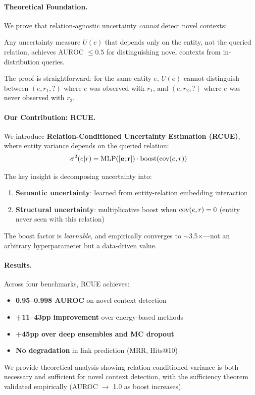 \paragraph{Theoretical Foundation.}
We prove that relation-agnostic uncertainty \emph{cannot} detect novel contexts:

\begin{theorem}
Any uncertainty measure $U(e)$ that depends only on the entity, not the queried relation, achieves AUROC $\leq 0.5$ for distinguishing novel contexts from in-distribution queries.
\end{theorem}

The proof is straightforward: for the same entity $e$, $U(e)$ cannot distinguish between $(e, r_1, ?)$ where $e$ was observed with $r_1$, and $(e, r_2, ?)$ where $e$ was never observed with $r_2$.

\paragraph{Our Contribution: RCUE.}
We introduce \textbf{Relation-Conditioned Uncertainty Estimation (RCUE)}, where entity variance depends on the queried relation:
\[
\sigma^2(e | r) = \text{MLP}([\mathbf{e}; \mathbf{r}]) \cdot \text{boost}(\mathrm{cov}(e, r))
\]

The key insight is decomposing uncertainty into:
\begin{enumerate}
    \item \textbf{Semantic uncertainty}: learned from entity-relation embedding interaction
    \item \textbf{Structural uncertainty}: multiplicative boost when $\mathrm{cov}(e,r) = 0$ (entity never seen with this relation)
\end{enumerate}

The boost factor is \emph{learnable}, and empirically converges to $\sim$3.5$\times$---not an arbitrary hyperparameter but a data-driven value.

\paragraph{Results.}
Across four benchmarks, RCUE achieves:
\begin{itemize}
    \item \textbf{0.95--0.998 AUROC} on novel context detection
    \item \textbf{+11--43pp improvement} over energy-based methods
    \item \textbf{+45pp over deep ensembles and MC dropout}
    \item \textbf{No degradation} in link prediction (MRR, Hits@10)
\end{itemize}

We provide theoretical analysis showing relation-conditioned variance is both necessary and sufficient for novel context detection, with the sufficiency theorem validated empirically (AUROC $\to$ 1.0 as boost increases).
